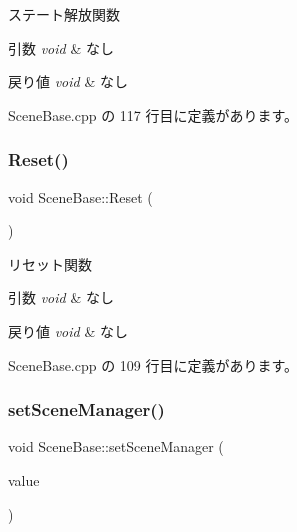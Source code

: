 ステート解放関数 


\begin{DoxyParams}{引数}
{\em void} & なし \\
\hline
\end{DoxyParams}

\begin{DoxyRetVals}{戻り値}
{\em void} & なし \\
\hline
\end{DoxyRetVals}


 Scene\+Base.\+cpp の 117 行目に定義があります。

\mbox{\label{class_scene_base_ae2dc09554ec21ffe231fa73a6cdd7ca1}} 
\subsubsection{\texorpdfstring{Reset()}{Reset()}}
{\footnotesize\ttfamily void Scene\+Base\+::\+Reset (\begin{DoxyParamCaption}{ }\end{DoxyParamCaption})}



リセット関数 


\begin{DoxyParams}{引数}
{\em void} & なし \\
\hline
\end{DoxyParams}

\begin{DoxyRetVals}{戻り値}
{\em void} & なし \\
\hline
\end{DoxyRetVals}


 Scene\+Base.\+cpp の 109 行目に定義があります。

\mbox{\label{class_scene_base_aae1930cae97c27ee7d54b4bd8896a515}} 
\subsubsection{\texorpdfstring{set\+Scene\+Manager()}{setSceneManager()}}
{\footnotesize\ttfamily void Scene\+Base\+::set\+Scene\+Manager (\begin{DoxyParamCaption}\item[{\mbox{\hyperlink{class_scene_manager}{Scene\+Manager}} $\ast$}]{value }\end{DoxyParamCaption})}



